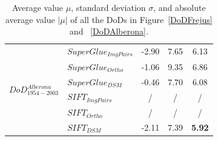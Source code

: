 \begin{table}
\begin{tabular}{||l|l|c|c|c||}
		\multirow{6}{*}{$DoD^{Alberona}_{1954-2003}$}
&${SuperGlue_{ImgPairs}}$ & -2.90 & 7.65 & 6.13\\
&${SuperGlue_{Ortho}}$ & -1.06 & 9.35 & 6.86\\
&${SuperGlue_{DSM}}$ & -0.46 & 7.70 & 6.08\\
&${SIFT_{ImgPairs}}$ & / & / & / \\
&${SIFT_{Ortho}}$ & / & / & / \\
&${SIFT_{DSM}}$ & -2.11 & 7.39 & \textbf{5.92}\\\hline
	\end{tabular}
	\caption{Average value $\mu$, standard deviation $\sigma$, and absolute average value $|\mu|$ of all the \ac{DoD}s in Figure~\ref{DoDFrejus} and ~\ref{DoDAlberona}.}
	\label{RoughDoDStatistic}
\end{table}


